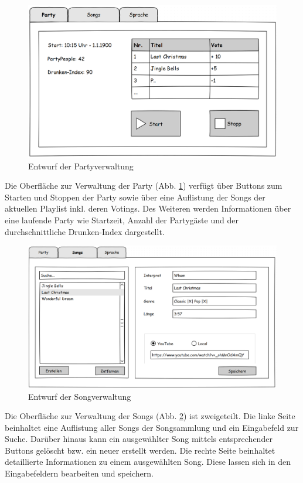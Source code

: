 \begin{figure}[H]
\centering
\includegraphics[width=0.85\linewidth]{Bilder/MockParty}
\caption{Entwurf der Partyverwaltung}
\label{fig:MockParty}
\end{figure}

Die Oberfläche zur Verwaltung der Party (Abb. \ref{fig:MockParty}) verfügt über Buttons zum Starten und Stoppen der Party sowie über eine Auflistung der Songs der aktuellen Playlist inkl. deren Votings. Des Weiteren werden Informationen über eine laufende Party wie Startzeit, Anzahl der Partygäste und der durchschnittliche Drunken-Index dargestellt.

\begin{figure}[H]
\centering
\includegraphics[width=1\linewidth]{Bilder/MockSongVerwaltung}
\caption{Entwurf der Songverwaltung}
\label{fig:MockSongVerwaltung}
\end{figure}

Die Oberfläche zur Verwaltung der Songs (Abb. \ref{fig:MockSongVerwaltung}) ist zweigeteilt. Die linke Seite beinhaltet eine Auflistung aller Songs der Songsammlung und ein Eingabefeld zur Suche. Darüber hinaus kann ein ausgewählter Song mittels entsprechender Buttons gelöscht bzw. ein neuer erstellt werden. Die rechte Seite 
beinhaltet detaillierte Informationen zu einem ausgewählten Song. Diese lassen sich in den Eingabefeldern bearbeiten und speichern.

